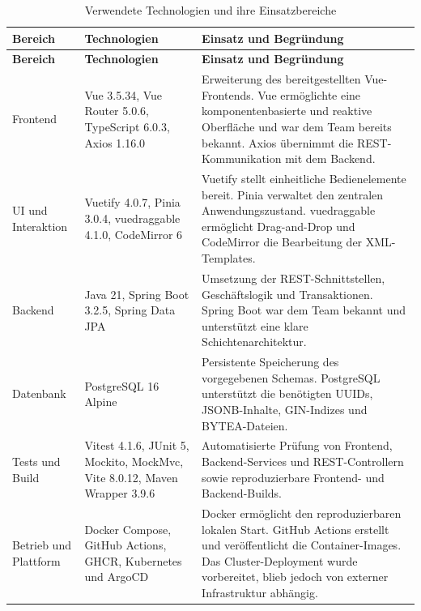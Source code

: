 ﻿\documentclass[11pt,a4paper]{article}
\begin{document}
\begin{longtable}{|p{.18\linewidth}|p{.28\linewidth}|p{.45\linewidth}|}
\caption{Verwendete Technologien und ihre Einsatzbereiche}
\label{tab:technologien}\\
\hline
\textbf{Bereich} &
\textbf{Technologien} &
\textbf{Einsatz und Begründung}\\
\hline
\endfirsthead

\hline
\textbf{Bereich} &
\textbf{Technologien} &
\textbf{Einsatz und Begründung}\\
\hline
\endhead

Frontend &
Vue 3.5.34, Vue Router 5.0.6, TypeScript 6.0.3, Axios 1.16.0 &
Erweiterung des bereitgestellten Vue-Frontends. Vue ermöglichte eine
komponentenbasierte und reaktive Oberfläche und war dem Team bereits bekannt.
Axios übernimmt die REST-Kommunikation mit dem Backend.\\
\hline

UI und Interaktion &
Vuetify 4.0.7, Pinia 3.0.4, vuedraggable 4.1.0, CodeMirror 6 &
Vuetify stellt einheitliche Bedienelemente bereit. Pinia verwaltet den
zentralen Anwendungszustand. vuedraggable ermöglicht Drag-and-Drop und
CodeMirror die Bearbeitung der XML-Templates.\\
\hline

Backend &
Java 21, Spring Boot 3.2.5, Spring Data JPA &
Umsetzung der REST-Schnittstellen, Geschäftslogik und Transaktionen.
Spring Boot war dem Team bekannt und unterstützt eine klare
Schichtenarchitektur.\\
\hline

Datenbank &
PostgreSQL 16 Alpine &
Persistente Speicherung des vorgegebenen Schemas. PostgreSQL unterstützt
die benötigten UUIDs, JSONB-Inhalte, GIN-Indizes und BYTEA-Dateien.\\
\hline

Tests und Build &
Vitest 4.1.6, JUnit 5, Mockito, MockMvc, Vite 8.0.12, Maven Wrapper 3.9.6 &
Automatisierte Prüfung von Frontend, Backend-Services und REST-Controllern
sowie reproduzierbare Frontend- und Backend-Builds.\\
\hline

Betrieb und Plattform &
Docker Compose, GitHub Actions, GHCR, Kubernetes und ArgoCD &
Docker ermöglicht den reproduzierbaren lokalen Start. GitHub Actions erstellt
und veröffentlicht die Container-Images. Das Cluster-Deployment wurde
vorbereitet, blieb jedoch von externer Infrastruktur abhängig.\\
\hline

\end{longtable}
\end{document}
